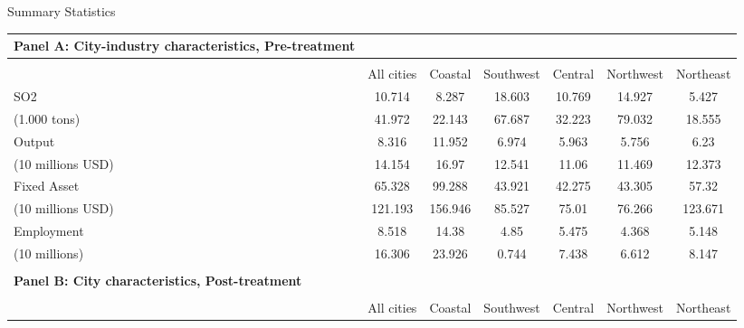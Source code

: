 \documentclass[
  convert={
    density=800 -alpha deactivate,
    size=1080x800,
    outext=.png
  },
]{standalone}
\begin{document}
\centering              
\begin{adjustbox}{varwidth=\maxdimen,max width=\linewidth}
\begin{threeparttable}   
  \caption{\small Summary Statistics}

  \begin{tabular}{l*{6}{c}}
    
    \multicolumn{1}{l}{\textbf{Panel A: City-industry characteristics, Pre-treatment}} \\
    
    \toprule
     	 	 	 	 	
    & \multicolumn{6}{c}{} \\ 
    \hline
    & \multicolumn{1}{c}{All cities} & \multicolumn{1}{c}{Coastal}
    & \multicolumn{1}{c}{Southwest} & \multicolumn{1}{c}{Central}
    & \multicolumn{1}{c}{Northwest}& \multicolumn{1}{c}{Northeast}
    \\ 
    \hline    
     
    SO2	&10.714	&8.287&	18.603&	10.769&	14.927&	5.427\\
    (1.000 tons)&	41.972&	22.143&	67.687&	32.223&	79.032&	18.555\\
    Output&	8.316	&11.952	&6.974	&5.963&	5.756&	6.23\\
    (10 millions USD)&	14.154	&16.97&	12.541&	11.06&	11.469&	12.373\\
    Fixed Asset&	65.328	&99.288	&43.921	&42.275	&43.305&	57.32\\
    (10 millions USD)&	121.193	&156.946&	85.527	&75.01&	76.266&	123.671\\
    Employment&	8.518&	14.38&	4.85&	5.475&	4.368&	5.148\\
    (10 millions)&	16.306&	23.926&	0.744&	7.438&	6.612&	8.147\\

    \bottomrule     
    \\ %
    
    \multicolumn{1}{l}{\textbf{Panel B: City characteristics, Post-treatment}} \\
    \toprule
    
    & \multicolumn{6}{c}{} \\ 
    \hline
    & \multicolumn{1}{c}{All cities} & \multicolumn{1}{c}{Coastal}
    & \multicolumn{1}{c}{Southwest} & \multicolumn{1}{c}{Central}
    & \multicolumn{1}{c}{Northwest}& \multicolumn{1}{c}{Northeast}
    \\ 
    \hline 
    \midrule 
    

\end{tabular}
\end{threeparttable}
\end{adjustbox}
\end{document}
